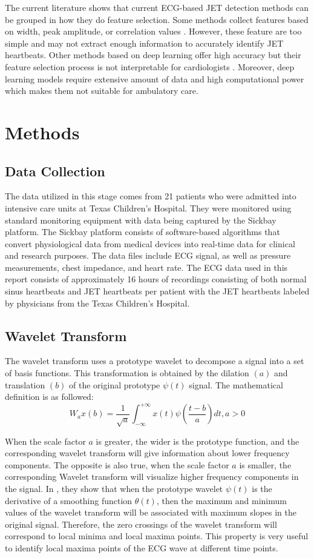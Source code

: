\documentclass[conference,compsoc]{IEEEtran}
\begin{document}
The current literature shows that current ECG-based JET detection methods can be grouped in how they do feature selection. Some methods collect features based on width, peak amplitude, or correlation values \cite{LlamedoMariano2011HCUF}. However, these feature are too simple and may not extract enough information to accurately identify JET heartbeats. Other methods based on deep learning offer high accuracy but their feature selection process is not interpretable for cardiologists \cite{MadanParul2022AHDL}. Moreover, deep learning models require extensive amount of data and high computational power which makes them not suitable for ambulatory care.


\section{Methods}

\subsection{Data Collection}
The data utilized in this stage comes from 21 patients who were admitted into intensive care units at Texas Children's Hospital. They were monitored using standard monitoring equipment with data being captured by the Sickbay platform. The Sickbay platform consists of software-based algorithms that convert physiological data from medical devices into real-time data for clinical and research purposes. The data files include ECG signal, as well as pressure measurements, chest impedance, and heart rate. The ECG data used in this report consists of approximately 16 hours of recordings consisting of both normal sinus heartbeats and JET heartbeats per patient with the JET heartbeats labeled by physicians from the Texas Children's Hospital.  

\subsection{Wavelet Transform}
The wavelet transform uses a prototype wavelet to decompose a signal into a set of basis functions. This transformation is obtained by the dilation $(a)$ and translation $(b)$ of the original prototype $\psi(t)$ signal. The mathematical definition is as followed:
$$W_ax(b) = \frac{1}{\sqrt{a}} \int_{-\infty}^{+\infty} x(t) \psi \left(\frac{t-b}{a} \right) dt, a > 0$$

When the scale factor $a$ is greater, the wider is the prototype function, and the corresponding wavelet transform will give information about lower frequency components. The opposite is also true, when the scale factor $a$ is smaller, the corresponding Wavelet transform will visualize higher frequency components in the signal. In \cite{1275572}, they show that when the prototype wavelet $\psi(t)$ is the derivative of a smoothing function $\theta(t)$, then the maximum and minimum values of the wavelet transform will be associated with maximum slopes in the original signal. Therefore, the zero crossings of the wavelet transform will correspond to local minima and local maxima points. This property is very useful to identify local maxima points of the ECG wave at different time points. 
\end{document}
